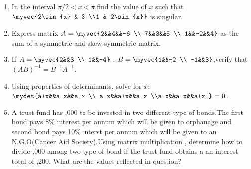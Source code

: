 \begin{enumerate}
\item In the interval $\pi/2 < x < \pi$,find the value of $x$ such that $\myvec{2\sin{x} & 3 \\1 & 2\sin{x}}$ is singular.\\

\item Express matrix $A=\myvec{2&&4&&-6 \\ 7&&3&&5 \\ 1&&-2&&4}$ as the sum of a symmetric and skew-symmetric matrix.\\

\item If $A = \myvec{2&&3 \\ 1&&-4}$ , $B = \myvec{1&&-2 \\ -1&&3}$,verify that $(AB)^{-1} = B^{-1} A^{-1}$.\\

\item Using properties of determinants, solve for $x$: $\mydet{a+x&&a-x&&a-x \\ a-x&&a+x&&a-x \\a-x&&a-x&&a+x } = 0$.\\

\item A trust fund has ,000 to be invested in two different type of bonds.The first bond pays 8\% interest per annum which will be given to orphanage and second bond pays 10\% interst per annum which will be given to an N.G.O(Cancer Aid Society).Using matrix multiplication , determine how to divide ,000 among two type of bond if the trust fund obtains a an interest total of ,200. What are the values reflected in question?
\end{enumerate} 
